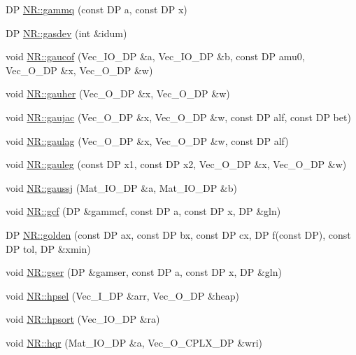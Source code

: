 \begin{DoxyCompactItemize}
DP \mbox{\hyperlink{namespaceNR_aae834b3eabbd4eb103d876551fe4a8bf}{N\+R\+::gammq}} (const DP a, const DP x)
\item 
DP \mbox{\hyperlink{namespaceNR_a035bd09228723898ec5481668f55c979}{N\+R\+::gasdev}} (int \&idum)
\item 
void \mbox{\hyperlink{namespaceNR_a8bd178e36c704700d52a5bcb56d25548}{N\+R\+::gaucof}} (Vec\+\_\+\+I\+O\+\_\+\+DP \&a, Vec\+\_\+\+I\+O\+\_\+\+DP \&b, const DP amu0, Vec\+\_\+\+O\+\_\+\+DP \&x, Vec\+\_\+\+O\+\_\+\+DP \&w)
\item 
void \mbox{\hyperlink{namespaceNR_a3214b0481212ec7e5322d6952177aac6}{N\+R\+::gauher}} (Vec\+\_\+\+O\+\_\+\+DP \&x, Vec\+\_\+\+O\+\_\+\+DP \&w)
\item 
void \mbox{\hyperlink{namespaceNR_a95634e9b78b176caeec3321c0cfa6fbf}{N\+R\+::gaujac}} (Vec\+\_\+\+O\+\_\+\+DP \&x, Vec\+\_\+\+O\+\_\+\+DP \&w, const DP alf, const DP bet)
\item 
void \mbox{\hyperlink{namespaceNR_abd073d049f60560546572cb5cf2210ef}{N\+R\+::gaulag}} (Vec\+\_\+\+O\+\_\+\+DP \&x, Vec\+\_\+\+O\+\_\+\+DP \&w, const DP alf)
\item 
void \mbox{\hyperlink{namespaceNR_a722933d3ddfd7e76e9533892768ae542}{N\+R\+::gauleg}} (const DP x1, const DP x2, Vec\+\_\+\+O\+\_\+\+DP \&x, Vec\+\_\+\+O\+\_\+\+DP \&w)
\item 
void \mbox{\hyperlink{namespaceNR_a1d6883edf9183e4e0a4b6be01655b057}{N\+R\+::gaussj}} (Mat\+\_\+\+I\+O\+\_\+\+DP \&a, Mat\+\_\+\+I\+O\+\_\+\+DP \&b)
\item 
void \mbox{\hyperlink{namespaceNR_a54a09ab3536295080e52c4deb5cc42c5}{N\+R\+::gcf}} (DP \&gammcf, const DP a, const DP x, DP \&gln)
\item 
DP \mbox{\hyperlink{namespaceNR_a0fb02a1e4932c1918d2a75bdcfec27cd}{N\+R\+::golden}} (const DP ax, const DP bx, const DP cx, DP f(const DP), const DP tol, DP \&xmin)
\item 
void \mbox{\hyperlink{namespaceNR_acf96c684ec4dc14593c22c45848ad511}{N\+R\+::gser}} (DP \&gamser, const DP a, const DP x, DP \&gln)
\item 
void \mbox{\hyperlink{namespaceNR_a5eaa00a5151ec180e13b5fd8824fd161}{N\+R\+::hpsel}} (Vec\+\_\+\+I\+\_\+\+DP \&arr, Vec\+\_\+\+O\+\_\+\+DP \&heap)
\item 
void \mbox{\hyperlink{namespaceNR_a2d78b1ffd173d958219ab98bbcdcd3c4}{N\+R\+::hpsort}} (Vec\+\_\+\+I\+O\+\_\+\+DP \&ra)
\item 
void \mbox{\hyperlink{namespaceNR_a78db7534f0991399c7f0d4a618175da7}{N\+R\+::hqr}} (Mat\+\_\+\+I\+O\+\_\+\+DP \&a, Vec\+\_\+\+O\+\_\+\+C\+P\+L\+X\+\_\+\+DP \&wri)

\end{DoxyCompactItemize}
